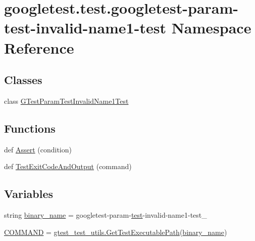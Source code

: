 \hypertarget{namespacegoogletest_1_1test_1_1googletest-param-test-invalid-name1-test}{}\section{googletest.\+test.\+googletest-\/param-\/test-\/invalid-\/name1-\/test Namespace Reference}
\label{namespacegoogletest_1_1test_1_1googletest-param-test-invalid-name1-test}
\subsection*{Classes}
\begin{DoxyCompactItemize}
\item 
class \mbox{\hyperlink{classgoogletest_1_1test_1_1googletest-param-test-invalid-name1-test_1_1_g_test_param_test_invalid_name1_test}{G\+Test\+Param\+Test\+Invalid\+Name1\+Test}}
\end{DoxyCompactItemize}
\subsection*{Functions}
\begin{DoxyCompactItemize}
\item 
def \mbox{\hyperlink{namespacegoogletest_1_1test_1_1googletest-param-test-invalid-name1-test_a0e1cc957de2fcf5c8169eeb022f126c3}{Assert}} (condition)
\item 
def \mbox{\hyperlink{namespacegoogletest_1_1test_1_1googletest-param-test-invalid-name1-test_a4f8537626401b283aac741d15909da9c}{Test\+Exit\+Code\+And\+Output}} (command)
\end{DoxyCompactItemize}
\subsection*{Variables}
\begin{DoxyCompactItemize}
\item 
string \mbox{\hyperlink{namespacegoogletest_1_1test_1_1googletest-param-test-invalid-name1-test_a8d28c943801f6ef770caaca166552b4f}{binary\+\_\+name}} = \textquotesingle{}googletest-\/param-\/\mbox{\hyperlink{_mutual_8h_a707ee03719e99670bf6cfdfd897b8456}{test}}-\/invalid-\/name1-\/test\+\_\+\textquotesingle{}
\item 
\mbox{\hyperlink{namespacegoogletest_1_1test_1_1googletest-param-test-invalid-name1-test_ab8f17c553a432a64a5266b13d71d7da5}{C\+O\+M\+M\+A\+ND}} = \mbox{\hyperlink{namespacegoogletest_1_1test_1_1gtest__test__utils_ac9af888c702350aac56b154a6af34098}{gtest\+\_\+test\+\_\+utils.\+Get\+Test\+Executable\+Path}}(\mbox{\hyperlink{namespacegoogletest_1_1test_1_1googletest-param-test-invalid-name1-test_a8d28c943801f6ef770caaca166552b4f}{binary\+\_\+name}})
\end{DoxyCompactItemize}


